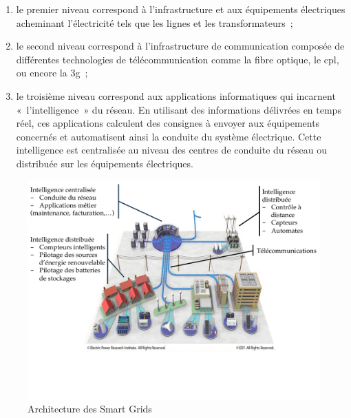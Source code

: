 \begin{enumerate}
    \item le premier niveau correspond à l'infrastructure et aux équipements 
    électriques acheminant l'électricité tels que les lignes et les 
    transformateurs~; 
    \item le second niveau correspond à l'infrastructure de communication 
    composée de différentes technologies de télécommunication comme la fibre 
    optique, le \gls{cpl}, ou encore la \gls{3g}~; 
    \item le troisième niveau correspond aux applications informatiques qui 
    incarnent «~l'intelligence~» du réseau. En utilisant des informations 
    délivrées en temps réel, ces applications calculent des consignes à envoyer 
    aux équipements concernés et automatisent ainsi la conduite du système 
    électrique.  Cette intelligence est centralisée au niveau des centres de 
    conduite du réseau ou distribuée sur les équipements électriques. 
\end{enumerate}

\begin{figure}[!htbp]
  
\includegraphics[trim= 0cm 4cm 0cm 0cm, width=1\textwidth]{figures/1_problematique/archiSmartGrids.pdf}
 \caption{Architecture des Smart Grids \protect\cite{favre2006ingenierie}}
 \label{fig:archismartGrids}
\end{figure}



